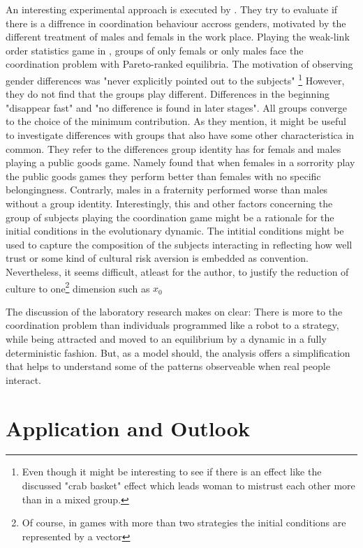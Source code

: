 \documentclass[11pt]{article}
\begin{document}
An interesting experimental approach is executed by 
\cite{dufwenberg_gender_2005}. They try to evaluate if there is a diffrence
in coordination behaviour accross genders, motivated by the different
treatment of males and femals in the work place. Playing the weak-link order
statistics game in \cite{van_huyck_tacit_1990}, groups of only femals or only
males face the coordination problem with Pareto-ranked equilibria. The 
motivation of observing gender differences was "never explicitly pointed 
out to the subjects" \parencite{dufwenberg_gender_2005}\footnote{
Even though it might be interesting to see if there is an effect like 
the discussed "crab basket" effect which leads woman to mistrust each other 
more than in a mixed group.} However, they do not find that the groups play
different. Differences in the beginning "disappear fast" and "no difference
is found in later stages". All groups converge to the choice of the minimum
contribution. As they mention, it might be useful to investigate differences
with groups that also have some other characteristica in common. They refer
to the differences group identity has for femals and males playing a 
public goods game. Namely \textcite{croson_groups_2008} found that when
females in a sorrority play the public goods games they perform better than 
females with no specific belongingness. Contrarly, males in a fraternity 
performed worse than males without a group identity. 
Interestingly, this and other factors concerning the group of subjects 
playing the coordination game might be a rationale for the initial conditions
in the evolutionary dynamic. The intitial conditions might be used to 
capture the composition of the subjects interacting in reflecting how well
trust or some kind of cultural risk aversion is embedded as convention. 
Nevertheless, it seems difficult, atleast for the author, to justify
the reduction of culture to one\footnote{Of course, in games with more 
than two strategies the initial conditions are represented by a vector}
dimension such as $x_0$

The discussion of the laboratory research makes on clear: There is more
to the coordination problem than individuals programmed like a robot 
to a strategy, while being attracted and moved to an equilibrium by a dynamic
in a fully deterministic fashion. But, as a model should, the analysis offers 
a simplification that helps to understand some of the patterns observeable 
when real people interact.
\section{Application and Outlook}
\end{document}
